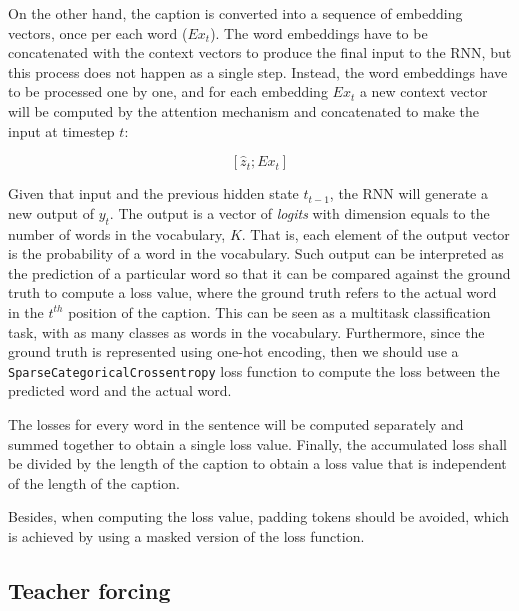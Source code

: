On the other hand, the caption is converted into a sequence of embedding vectors, once per each word ($Ex_t$).  The word embeddings have to be concatenated with the context vectors to produce the final input to the RNN, but this process does not happen as a single step. Instead, the word embeddings have to be processed one by one, and for each embedding $Ex_t$  a new context vector will be computed by the attention mechanism and concatenated to make the input at timestep $t$:

$$[\hat{z}_t;Ex_t]$$

Given that input and the previous hidden state $t_{t-1}$, the RNN will generate a new output of $y_t$. The output is a vector of \textit{logits} with dimension equals to the number of words in the vocabulary, $K$. That is, each element of the output vector is the probability of a word in the vocabulary. Such output can be interpreted as the prediction of a particular word so that it can be compared against the ground truth to compute a loss value, where the ground truth refers to the actual word in the $t^{th}$ position of the caption. This can be seen as a multitask classification task, with as many classes as words in the vocabulary. Furthermore, since the ground truth is represented using one-hot encoding, then we should use a \lstinline{SparseCategoricalCrossentropy} loss function to compute the loss between the predicted word and the actual word.

The losses for every word in the sentence will be computed separately and summed together to obtain a single loss value. Finally, the accumulated loss shall be divided by the length of the caption to obtain a loss value that is independent of the length of the caption.

Besides, when computing the loss value, padding tokens should be avoided, which is achieved by using a masked version of the loss function. 


\subsection{Teacher forcing}\label{subsec:teacher_forcing}

